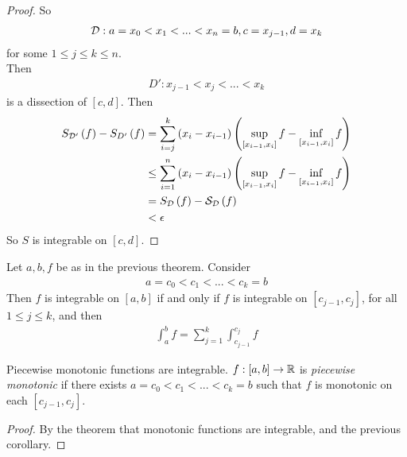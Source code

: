\documentclass[a4paper]{article}
\begin{document}
\begin{thm}
\begin{proof}
So
\begin{equation*}
\begin{aligned}
\mathcal{D}:a=x_0<x_1<...<x_n = b, c= x_{j-1}, d=x_k
\end{aligned}
\end{equation*}
for some $1\leq j \leq k \leq n$.\\
Then
\begin{equation*}
\begin{aligned}
D': x_{j-1} < x_j < ... < x_k
\end{aligned}
\end{equation*}
is a dissection of $\left[c,d\right]$. Then
\begin{equation*}
\begin{aligned}
S_{\mathcal{D}'} \left(f\right) - S_{D'} \left(f\right) &= \sum_{i=j}^k \left(x_i-x_{i-1}\right) \left(\sup_{\left[x_{i-1},x_i\right]} f - \inf_{\left[x_{i-1},x_i\right]} f\right)\\
&\leq \sum_{i=1}^n \left(x_i-x_{i-1}\right) \left(\sup_{\left[x_{i-1},x_i\right]} f - \inf_{\left[x_{i-1},x_i\right]} f\right)\\
&= S_{\mathcal{D}} \left(f\right) - \mathcal{S}_{\mathcal{D}} \left(f\right)\\
&<\epsilon
\end{aligned}
\end{equation*}
So $S$ is integrable on $\left[c,d\right]$.
\end{proof}
\end{thm}

\begin{coro}
Let $a,b,f$ be as in the previous theorem. Consider
\begin{equation*}
\begin{aligned}
a=c_0 < c_1 < ... < c_k = b
\end{aligned}
\end{equation*}
Then $f$ is integrable on $\left[a,b\right]$ if and only if $f$ is integrable on $\left[c_{j-1}, c_j\right]$, for all $1\leq j\leq k$, and then
\begin{equation*}
\begin{aligned}
\int_a^b f = \sum_{j=1}^k \int_{c_{j-1}}^{c_j} f
\end{aligned}
\end{equation*}
\end{coro}

\begin{coro}
Piecewise monotonic functions are integrable. $f:\left[a,b\right]\to \mathbb{R}$ is \emph{piecewise monotonic} if there exists $a=c_0 < c_1 < ... < c_k = b$ such that $f$ is monotonic on each $\left[c_{j-1},c_j\right]$.\\
\begin{proof}
By the theorem that monotonic functions are integrable, and the previous corollary.
\end{proof}
\end{coro}
\end{document}
